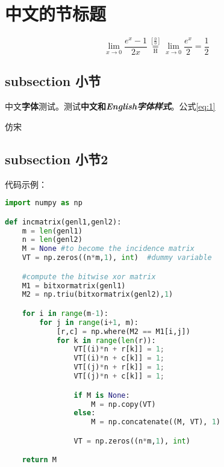\documentclass[a4paper,twoside]{ctexbook}
\begin{document}
{
  \hypersetup{hidelinks}
  \minitoc
}

\vspace{10ex}

\lipsum[3]

\section{中文的节标题}

\lipsum[3-5]

\begin{equation}
  \label{eq:1}
   \lim_{x\to 0}{\frac{e^x-1}{2x}}
   \overset{\left[\frac{0}{0}\right]}{\underset{\mathrm{H}}{=}}
   \lim_{x\to 0}{\frac{e^x}{2}}={\frac{1}{2}}
\end{equation}

\subsection{subsection 小节}

中文\textbf{字体}测试。测试\textbf{中文和\textit{English字体样式}}。公式\ref{eq:1}

{\fzfs 仿宋}

\subsection{subsection 小节2}

代码示例：

\begin{lstlisting}[language=Python,caption={Python example}]
import numpy as np

def incmatrix(genl1,genl2):
    m = len(genl1)
    n = len(genl2)
    M = None #to become the incidence matrix
    VT = np.zeros((n*m,1), int)  #dummy variable

    #compute the bitwise xor matrix
    M1 = bitxormatrix(genl1)
    M2 = np.triu(bitxormatrix(genl2),1)

    for i in range(m-1):
        for j in range(i+1, m):
            [r,c] = np.where(M2 == M1[i,j])
            for k in range(len(r)):
                VT[(i)*n + r[k]] = 1;
                VT[(i)*n + c[k]] = 1;
                VT[(j)*n + r[k]] = 1;
                VT[(j)*n + c[k]] = 1;

                if M is None:
                    M = np.copy(VT)
                else:
                    M = np.concatenate((M, VT), 1)

                VT = np.zeros((n*m,1), int)

    return M
\end{lstlisting}
\end{document}
